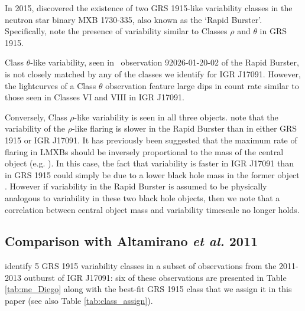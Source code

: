 \par In 2015, \citet{Bagnoli_RB} discovered the existence of two GRS 1915-like variability classes in the neutron star binary MXB 1730-335, also known as the `Rapid Burster'.  Specifically, \citet{Bagnoli_RB} note the presence of variability similar to Classes $\rho$ and $\theta$ in GRS 1915.
\par Class $\theta$-like variability, seen in \rxte\ observation 92026-01-20-02 of the Rapid Burster, is not closely matched by any of the classes we identify for IGR J17091.  However, the lightcurves of a Class $\theta$ observation feature large dips in count rate similar to those seen in Classes VI and VIII in IGR J17091.
\par Conversely, Class $\rho$-like variability is seen in all three objects.  \citet{Bagnoli_RB} note that the variability of the $\rho$-like flaring is slower in the Rapid Burster than in either GRS 1915 or IGR J17091. It has previously been suggested that the maximum rate of flaring in LMXBs should be inversely proportional to the mass of the central object (e.g. \citealp{Belloni_Timescales,Frank_Timescales}).  In this case, the fact that variability is faster in IGR J17091 than in GRS 1915 could simply be due to a lower black hole mass in the former object \citep{Altamirano_IGR_FH}.  However if variability in the Rapid Burster is assumed to be physically analogous to variability in these two black hole objects, then we note that a correlation between central object mass and variability timescale no longer holds.

\subsection{Comparison with Altamirano \textit{et al.} 2011}

\label{sec:Alta}
\par \citet{Altamirano_IGR_FH} identify 5 GRS 1915 variability classes in a subset of observations from the 2011-2013 outburst of IGR J17091: six of these observations are presented in Table \ref{tab:me_Diego} along with the best-fit GRS 1915 class that we assign it in this paper (see also Table \ref{tab:class_assign}).


